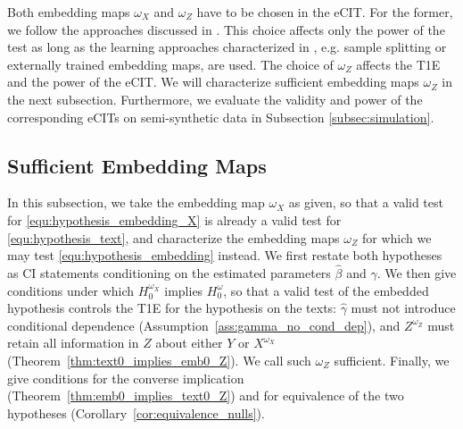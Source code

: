 \documentclass[twoside,11pt]{article}
\begin{document}
Both embedding maps $\omega_X$ and $\omega_Z$ have to be chosen in the eCIT. 
For the former, we follow the approaches discussed in \citet{simnacher2026deep}. This choice affects only the power of the test as long as the learning approaches characterized in \citet[][Corollary~3]{simnacher2026deep}, e.g. sample splitting or externally trained embedding maps, are used. 
The choice of $\omega_Z$ affects the T1E and the power of the eCIT. 
We will characterize sufficient embedding maps $\omega_Z$ in the next subsection. %
Furthermore, we evaluate the validity and power of the corresponding eCITs on semi-synthetic data in Subsection \ref{subsec:simulation}.

\subsection{Sufficient Embedding Maps}\label{subsec:suff_embedding_maps}

In this subsection, we take the embedding map $\omega_X$ as given, so that a valid test for \eqref{equ:hypothesis_embedding_X} is already a valid test for \eqref{equ:hypothesis_text}, and characterize the embedding maps $\omega_Z$ for which we may test \eqref{equ:hypothesis_embedding} instead. We first restate both hypotheses as CI statements conditioning on the estimated parameters $\hat\beta$ and $\hat\gamma$. We then give conditions under which $H_0^{\omega_X}$ implies $H_0^{\omega}$, so that a valid test of the embedded hypothesis controls the T1E for the hypothesis on the texts: $\hat\gamma$ must not introduce conditional dependence (Assumption~\ref{ass:gamma_no_cond_dep}), and $Z^{\omega_Z}$ must retain all information in $Z$ about either $Y$ or $X^{\omega_X}$ (Theorem~\ref{thm:text0_implies_emb0_Z}). We call such $\omega_Z$ sufficient. Finally, we give conditions for the converse implication (Theorem~\ref{thm:emb0_implies_text0_Z}) and for equivalence of the two hypotheses (Corollary~\ref{cor:equivalence_nulls}).
\end{document}
